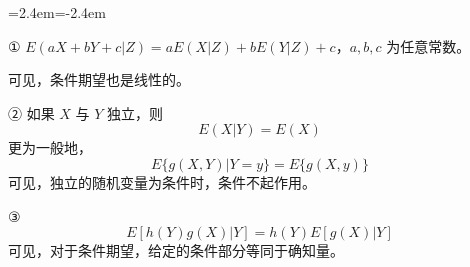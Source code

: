 \documentclass[11pt,openany,UTF8]{ctexbook}
\newenvironment{citemize}
  {\begin{list}{}{\leftmargin=2.4em\itemindent=-2.4em\itemsep=1pt\topsep=3pt\parsep=0pt}}
  {\end{list}}
\begin{document}
\begin{citemize}
  \item ① $E(aX+bY+c|Z)=aE(X|Z)+bE(Y|Z)+c$\nobreak，$a,b,c$ 为任意常数\nobreak。

  可见\nobreak，条件期望也是线性的\nobreak。

  \item ② 如果 $X$ 与 $Y$ 独立\nobreak，则
  \begin{equation}
  E(X|Y)=E(X)
  \label{eq:1.54}
  \end{equation}
  更为一般地\nobreak，
  \begin{equation}
  E\{g(X,Y)|Y=y\}=E\{g(X,y)\}
  \label{eq:1.55}
  \end{equation}
  可见\nobreak，独立的随机变量为条件时\nobreak，条件不起作用\nobreak。

  \item ③
  \begin{equation}
  E[h(Y)g(X)|Y]=h(Y)E[g(X)|Y]
  \label{eq:1.56}
  \end{equation}
  可见\nobreak，对于条件期望\nobreak，给定的条件部分等同于确知量\nobreak。
\end{citemize}
\end{document}
